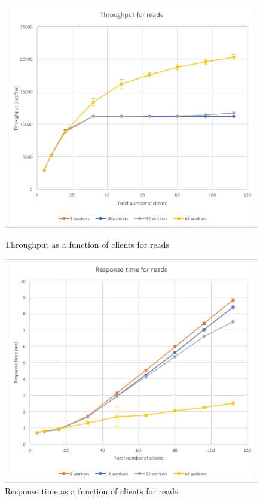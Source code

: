 \documentclass[11pt,a4paper]{article}
\begin{document}
\begin{figure}[!h]
    \centering
    \begin{minipage}[b]{.45\textwidth}
        \centering
        \includegraphics[width=\textwidth]{processing/graphics/bench_2mw_through-clients_reads.png}
        \caption{Throughput as a function of clients for reads}
        \label{png::bench_2mw_through-clients_reads}
    \end{minipage}
    \qquad
    \begin{minipage}[b]{.45\textwidth}
        \centering
        \includegraphics[width=\textwidth]{processing/graphics/bench_2mw_latency-clients_reads.png}
        \caption{Response time as a function of clients for reads}
        \label{png::bench_2mw_latency-clients_reads}
    \end{minipage}
\end{figure}
\end{document}
